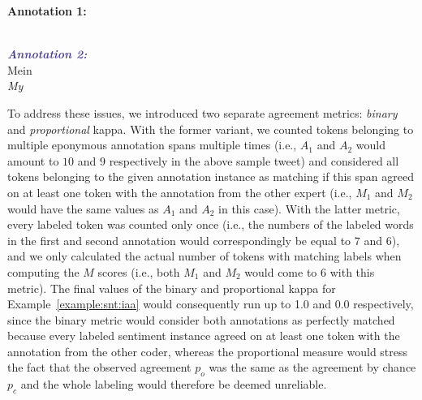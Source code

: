 \begin{example}\label{example:snt:iaa}
\textcolor{red3}{\textbf{Annotation 1:}}\\
\upshape{}\\

\noindent\textcolor{darkslateblue}{\textbf{\itshape Annotation 2:}}\\
Mein \\
\itshape My \upshape{}
\end{example}

To address these issues, we introduced two separate agreement metrics:
\emph{binary} and \emph{proportional} kappa.  With the former variant,
we counted tokens belonging to multiple eponymous annotation spans
multiple times (i.e., $A_1$ and $A_2$ would amount to $10$ and $9$
respectively in the above sample tweet) and considered all tokens
belonging to the given annotation instance as matching if this span
agreed on at least one token with the annotation from the other expert
(i.e., $M_1$ and $M_2$ would have the same values as $A_1$ and $A_2$
in this case).  With the latter metric, every labeled token was
counted only once (i.e., the numbers of the labeled words in the first
and second annotation would correspondingly be equal to $7$ and $6$),
and we only calculated the actual number of tokens with matching
labels when computing the $M$ scores (i.e., both $M_1$ and $M_2$ would
come to $6$ with this metric).  The final values of the binary and
proportional kappa for Example~\ref{example:snt:iaa} would
consequently run up to 1.0 and 0.0 respectively, since the binary
metric would consider both annotations as perfectly matched because
every labeled sentiment instance agreed on at least one token with the
annotation from the other coder, whereas the proportional measure
would stress the fact that the observed agreement $p_o$ was the same
as the agreement by chance $p_c$ and the whole labeling would
therefore be deemed unreliable.

